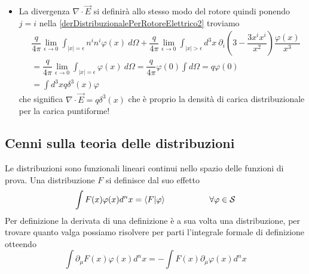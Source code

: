 \documentclass[12pt,a4paper,titlepage, twoside, openright]{book}
\numberwithin{equation}{chapter}
\begin{document}
\begin{itemize}
\[\]
e il $d\Sigma^i$ sarà dato da
\[
d\Sigma^i=n^id\Omega \epsilon^2 \hspace{0.15\linewidth} n^i=\dfrac{x^i}{x}
\]
Il cambio di segno c'è stato perchè il versore $n^i$ punta verso l'esterno mentre il versore uscente dal volume $\left|x\right|>\epsilon$ punto verso l'interno.
Possiamo quindi finalmente riscrivere la \ref{derDistribuzionalePerRotoreElettrico} come
\begin{equation}\label{derDistribuzionalePerRotoreElettrico2}
\dfrac{q}{4\pi} \lim_{\epsilon\rightarrow 0} \int_{\left|x\right|=\epsilon} n^in^j\varphi(x) \> d\Omega 
+ 
\dfrac{q}{4\pi} \lim_{\epsilon\rightarrow 0} \int_{\left|x\right|>\epsilon} d^3x \> \partial_i \left( \delta^{ij}-\dfrac{3x^ix^j}{x^2} \right) \dfrac{\varphi(x)}{x^3} 
\end{equation}
Se ora moltiplichiamo per $\epsilon^{ijk}$ la \ref{derDistribuzionalePerRotoreElettrico2} ci definisce l'effetto della distribuzione rotore di $E_j$, ma contraendo $\epsilon^{ijk}$ con $n^in^j$, $\delta_{ij}$ e $x^ix^j$, tutti simmetrici, questa sarà nulla.
Quindi $\nabla\times\vec{E}=0$.
\item La divergenza $\nabla\cdot\vec{E}$ si definirà allo stesso modo del rotore quindi ponendo $j=i$ nella \ref{derDistribuzionalePerRotoreElettrico2} troviamo
\begin{align*}
& \dfrac{q}{4\pi} \lim_{\epsilon\rightarrow 0} \int_{\left|x\right|=\epsilon} n^in^i\varphi(x) \> d\Omega 
+ 
\dfrac{q}{4\pi} \lim_{\epsilon\rightarrow 0} \int_{\left|x\right|>\epsilon} d^3x \> \partial_i \left( 3-\dfrac{3x^ix^i}{x^2} \right) \dfrac{\varphi(x)}{x^3} \\
& =
\dfrac{q}{4\pi} \lim_{\epsilon\rightarrow 0} \int_{\left|x\right|=\epsilon}\varphi(x) \> d\Omega = \dfrac{q}{4\pi}\varphi(0) \int d\Omega = q\varphi(0) \\
& =  \int d^3x q\delta^{3}(x)\varphi
\end{align*}
che significa $\nabla\cdot\vec{E}=q\delta^3(x)$ che è proprio la densità di carica distribuzionale per la carica puntiforme!
\end{itemize}

\subsection{Cenni sulla teoria delle distribuzioni}
Le distribuzioni sono funzionali lineari continui nello spazio delle funzioni di prova. 
Una distribuzione $F$ si definisce dal suo effetto 
\[
\int F(x)\varphi(x) d^nx= \left\langle F | \varphi \right\rangle \hspace{0.15\linewidth} \forall \varphi \in \mathcal{S}
\]
Per definizione la derivata di una definizione è a sua volta una distribuzione, per trovare quanto valga possiamo risolvere per parti l'integrale formale di definizione otteendo
\[
\int \partial_\mu F(x) \varphi(x) d^nx= -\int F(x) \partial_\mu\varphi(x) d^nx
\]
\end{document}
